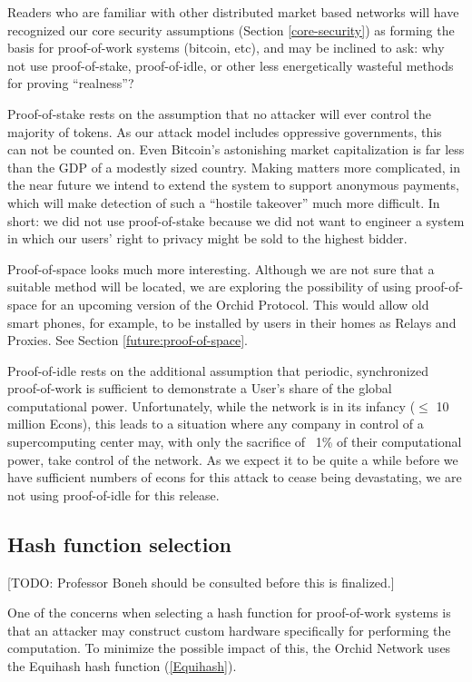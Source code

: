 \documentclass{article}
\newcommand{\mesh}{Orchid}
\begin{document}
Readers who are familiar with other distributed market based networks will have recognized our core security assumptions (Section \ref{core-security}) as forming the basis for proof-of-work systems (bitcoin, etc), and may be inclined to ask: why not use proof-of-stake, proof-of-idle, or other less energetically wasteful methods for proving “realness”?

Proof-of-stake rests on the assumption that no attacker will ever control the majority of tokens. As our attack model includes oppressive governments, this can not be counted on. Even Bitcoin’s astonishing market capitalization is far less than the GDP of a modestly sized country. Making matters more complicated, in the near future we intend to extend the system to support anonymous payments, which will make detection of such a ``hostile takeover'' much more difficult. In short: we did not use proof-of-stake because we did not want to engineer a system in which our users’ right to privacy might be sold to the highest bidder.

Proof-of-space looks much more interesting. Although we are not sure that a suitable method will be located, we are exploring the possibility of using proof-of-space for an upcoming version of the \mesh{} Protocol. This would allow old smart phones, for example, to be installed by users in their homes as Relays and Proxies. See Section \ref{future:proof-of-space}.

Proof-of-idle rests on the additional assumption that periodic, synchronized proof-of-work is sufficient to demonstrate a User’s share of the global computational power. Unfortunately, while the network is in its infancy ($\leq$ 10 million Econs), this leads to a situation where any company in control of a supercomputing center may, with only the sacrifice of ~1\% of their computational power, take control of the network. As we expect it to be quite a while before we have sufficient numbers of econs for this attack to cease being devastating, we are not using proof-of-idle for this release.

\subsection{Hash function selection}

[TODO: Professor Boneh should be consulted before this is finalized.]

One of the concerns when selecting a hash function for proof-of-work
systems is that an attacker may construct custom hardware specifically
for performing the computation. To minimize the possible impact of
this, the Orchid Network uses the Equihash hash function
(\ref{Equihash}).
\end{document}
